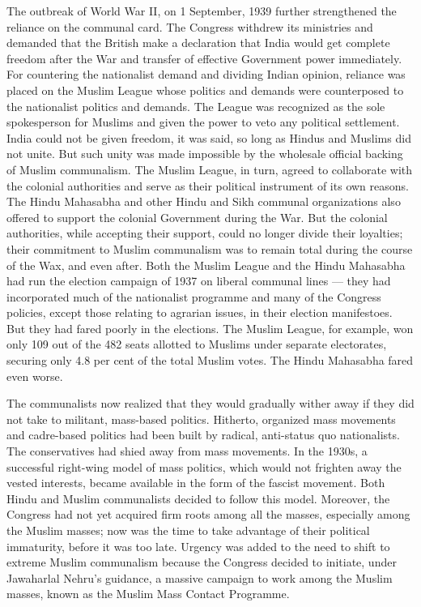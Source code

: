 The outbreak of World War II, on 1 September, 1939 further strengthened the reliance on the communal card. The Congress withdrew its ministries and demanded that the British make a declaration that India would get complete freedom after the War and transfer of effective Government power immediately. For countering the nationalist demand and dividing Indian opinion, reliance was placed on the Muslim League whose politics and demands were counterposed to the nationalist politics and demands. The League was recognized as the sole spokesperson for Muslims and given the power to veto any political settlement. India could not be given freedom, it was said, so long as Hindus and Muslims did not unite. But such unity was made impossible by the wholesale official backing of Muslim communalism. The Muslim League, in turn, agreed to collaborate with the colonial authorities and serve as their political instrument of its own reasons. The Hindu Mahasabha and other Hindu and Sikh communal organizations also offered to support the colonial Government during the War. But the colonial authorities, while accepting their support, could no longer divide their loyalties; their commitment to Muslim communalism was to remain total during the course of the Wax, and even after. Both the Muslim League and the Hindu Mahasabha had run the election campaign of 1937 on liberal communal lines — they had incorporated much of the nationalist programme and many of the Congress policies, except those relating to agrarian issues, in their election manifestoes. But they had fared poorly in the elections. The Muslim League, for example, won only 109 out of the 482 seats allotted to Muslims under separate electorates, securing only 4.8 per cent of the total Muslim votes. The Hindu Mahasabha fared even worse. 

The communalists now realized that they would gradually wither away if they did not take to militant, mass-based politics. Hitherto, organized mass movements and cadre-based politics had been built by radical, anti-status quo nationalists. The conservatives had shied away from mass movements. In the 1930s, a successful right-wing model of mass politics, which would not frighten away the vested interests, became available in the form of the fascist movement. Both Hindu and Muslim communalists decided to follow this model. Moreover, the Congress had not yet acquired firm roots among all the masses, especially among the Muslim masses; now was the time to take advantage of their political immaturity, before it was too late. Urgency was added to the need to shift to extreme Muslim communalism because the Congress decided to initiate, under Jawaharlal Nehru’s guidance, a massive campaign to work among the Muslim masses, known as the Muslim Mass Contact Programme. 

